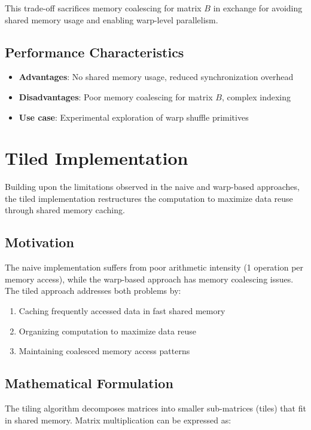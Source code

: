 \documentclass{amsbook}
\theoremstyle{definition}
\begin{document}
This trade-off sacrifices memory coalescing for matrix $B$ in exchange for avoiding shared memory usage and enabling warp-level parallelism.

\subsection{Performance Characteristics}

\begin{itemize}
\item \textbf{Advantages}: No shared memory usage, reduced synchronization overhead
\item \textbf{Disadvantages}: Poor memory coalescing for matrix $B$, complex indexing
\item \textbf{Use case}: Experimental exploration of warp shuffle primitives
\end{itemize}

\section{Tiled Implementation}

Building upon the limitations observed in the naive and warp-based approaches, the tiled implementation restructures the computation to maximize data reuse through shared memory caching.

\subsection{Motivation}

The naive implementation suffers from poor arithmetic intensity (1 operation per memory access), while the warp-based approach has memory coalescing issues. The tiled approach addresses both problems by:

\begin{enumerate}
\item Caching frequently accessed data in fast shared memory
\item Organizing computation to maximize data reuse
\item Maintaining coalesced memory access patterns
\end{enumerate}

\subsection{Mathematical Formulation}

The tiling algorithm decomposes matrices into smaller sub-matrices (tiles) that fit in shared memory. Matrix multiplication can be expressed as:
\end{document}
